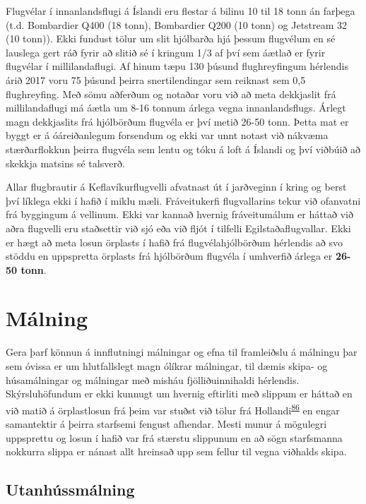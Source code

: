 \documentclass[icelandic,]{book}
\begin{document}
Flugvélar í innanlandsflugi á Íslandi eru flestar á bilinu 10 til 18 tonn án farþega (t.d. Bombardier Q400 (18 tonn), Bombardier Q200 (10 tonn) og Jetstream 32 (10 tonn)). Ekki fundust tölur um slit hjólbarða hjá þessum flugvélum en sé lauslega gert ráð fyrir að slitið sé í kringum 1/3 af því sem áætlað er fyrir flugvélar í millilandaflugi. Af hinum tæpu 130 þúsund flughreyfingum hérlendis árið 2017 voru 75 þúsund þeirra snertilendingar sem reiknast sem 0,5 flughreyfing. Með sömu aðferðum og notaðar voru við að meta dekkjaslit frá millilandaflugi má áætla um 8-16 tonnum árlega vegna innanlandsflugs. Árlegt magn dekkjaslits frá hjólbörðum flugvéla er því metið 26-50 tonn. Þetta mat er byggt er á óáreiðanlegum forsendum og ekki var unnt notast við nákvæma stærðarflokkun þeirra flugvéla sem lentu og tóku á loft á Íslandi og því viðbúið að skekkja matsins sé talsverð.

Allar flugbrautir á Keflavíkurflugvelli afvatnast út í jarðveginn í kring og berst því líklega ekki í hafið í miklu mæli. Fráveitukerfi flugvallarins tekur við ofanvatni frá byggingum á vellinum. Ekki var kannað hvernig fráveitumálum er háttað við aðra flugvelli eru staðsettir við sjó eða við fljót í tilfelli Egilstaðaflugvallar. Ekki er hægt að meta losun örplasts í hafið frá flugvélahjólbörðum hérlendis að svo stöddu en uppspretta örplasts frá hjólbörðum flugvéla í umhverfið árlega er \textbf{26-50 tonn}.

\hypertarget{malning}{%
\section*{Málning}\label{malning}}

Gera þarf könnun á innflutningi málningar og efna til framleiðslu á málningu þar sem óvissa er um hlutfallslegt magn ólíkrar málningar, til dæmis skipa- og húsamálningar og málningar með misháu fjölliðuinnihaldi hérlendis. Skýrsluhöfundum er ekki kunnugt um hvernig eftirliti með slippum er háttað en við matið á örplastlosun frá þeim var stuðst við tölur frá Hollandi\textsuperscript{\protect\hyperlink{ref-Verschoor2016}{86}} en engar samantektir á þeirra starfsemi fengust afhendar. Mesti munur á mögulegri uppsprettu og losun í hafið var frá stærstu slippunum en að sögn starfsmanna nokkurra slippa er nánast allt hreinsað upp sem fellur til vegna viðhalds skipa.

\hypertarget{utanhussmalning}{%
\subsection*{Utanhússmálning}\label{utanhussmalning}}
\end{document}
